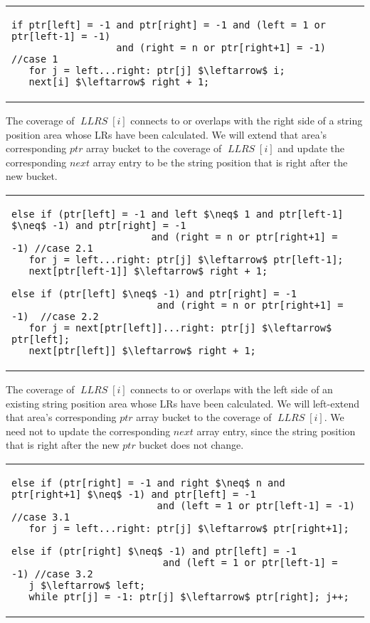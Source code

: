 \documentclass[preprint]{elsarticle}
\DeclareMathOperator{\llrs}{\mathit{LLRS}}
\begin{document}
\smallskip 

\begin{tabular}{l}
{\footnotesize
\begin{lstlisting}
if ptr[left] = -1 and ptr[right] = -1 and (left = 1 or ptr[left-1] = -1)
                  and (right = n or ptr[right+1] = -1)  //case 1
   for j = left...right: ptr[j] $\leftarrow$ i;
   next[i] $\leftarrow$ right + 1;
\end{lstlisting}
}
\end{tabular}

\smallskip 

 The coverage of $\llrs[i]$ connects to or overlaps
with the right side of a string position area whose LRs have been
calculated. We will extend that area's corresponding $ptr$ array bucket to
the coverage of $\llrs[i]$ and update the corresponding $next$ array entry 
to be the string position that is right after the new bucket.

\smallskip 

\begin{tabular}{l}
{\footnotesize
\begin{lstlisting}
else if (ptr[left] = -1 and left $\neq$ 1 and ptr[left-1] $\neq$ -1) and ptr[right] = -1
                        and (right = n or ptr[right+1] = -1) //case 2.1
   for j = left...right: ptr[j] $\leftarrow$ ptr[left-1];
   next[ptr[left-1]] $\leftarrow$ right + 1;

else if (ptr[left] $\neq$ -1) and ptr[right] = -1
                         and (right = n or ptr[right+1] = -1)  //case 2.2
   for j = next[ptr[left]]...right: ptr[j] $\leftarrow$ ptr[left];
   next[ptr[left]] $\leftarrow$ right + 1;
\end{lstlisting}
}
\end{tabular}

\smallskip

 The coverage of $\llrs[i]$ connects to or
overlaps with the left side of an existing string position area whose
LRs have been calculated. We will left-extend that area's corresponding $ptr$ array
bucket to the coverage of $\llrs[i]$. We need not to update the
corresponding $next$ array entry, since the string position that is
right after the new $ptr$ bucket does not change.


\smallskip

\begin{tabular}{l}
{\footnotesize
\begin{lstlisting}
else if (ptr[right] = -1 and right $\neq$ n and ptr[right+1] $\neq$ -1) and ptr[left] = -1
                         and (left = 1 or ptr[left-1] = -1) //case 3.1 
   for j = left...right: ptr[j] $\leftarrow$ ptr[right+1];

else if (ptr[right] $\neq$ -1) and ptr[left] = -1 
                          and (left = 1 or ptr[left-1] = -1) //case 3.2
   j $\leftarrow$ left;
   while ptr[j] = -1: ptr[j] $\leftarrow$ ptr[right]; j++;
\end{lstlisting}
}
\end{tabular}
\end{document}
